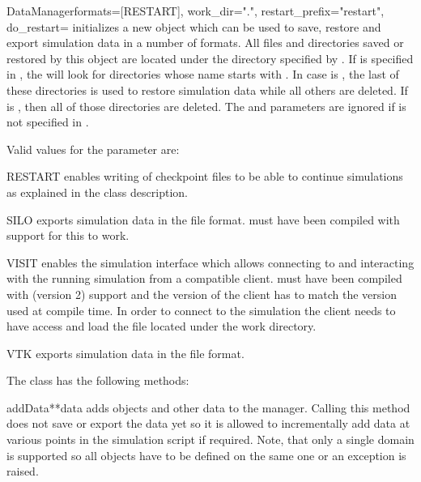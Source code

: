 \begin{classdesc}{DataManager}{formats=[RESTART], work_dir=".", restart_prefix="restart", do_restart=\True}
    initializes a new  object which can be used to save,
    restore and export simulation data in a number of formats.
    All files and directories saved or restored by this object are located
    under the directory specified by .
    If  is specified in , the  will
    look for directories whose name starts with .
    In case  is \True, the last of these directories is used
    to restore simulation data while all others are deleted.
    If  is \False, then all of those directories are deleted.
    The  and  parameters are ignored if
     is not specified in .
\end{classdesc}

\noindent Valid values for the  parameter are:
\begin{memberdesc}[DataManager]{RESTART}
    enables writing of checkpoint files to be able to continue simulations
    as explained in the class description.
\end{memberdesc}
\begin{memberdesc}[DataManager]{SILO}
    exports simulation data in the \SILO file format. \escript must have
    been compiled with \SILO support for this to work.
\end{memberdesc}
\begin{memberdesc}[DataManager]{VISIT}
    enables the \VisIt simulation interface which allows connecting to and
    interacting with the running simulation from a compatible \VisIt client.
    \escript must have been compiled with \VisIt (version 2) support and the
    version of the client has to match the version used at compile time.
    In order to connect to the simulation the client needs to have access and
    load the file  located under the work directory.
\end{memberdesc}
\begin{memberdesc}[DataManager]{VTK}
    exports simulation data in the \VTK file format.
\end{memberdesc}

\noindent The  class has the following methods:
\begin{methoddesc}[DataManager]{addData}{**data}
    adds \Data objects and other data to the manager. Calling this method does
    not save or export the data yet so it is allowed to incrementally add data
    at various points in the simulation script if required.
    Note, that only a single domain is supported so all \Data objects have to
    be defined on the same one or an exception is raised.
\end{methoddesc}

